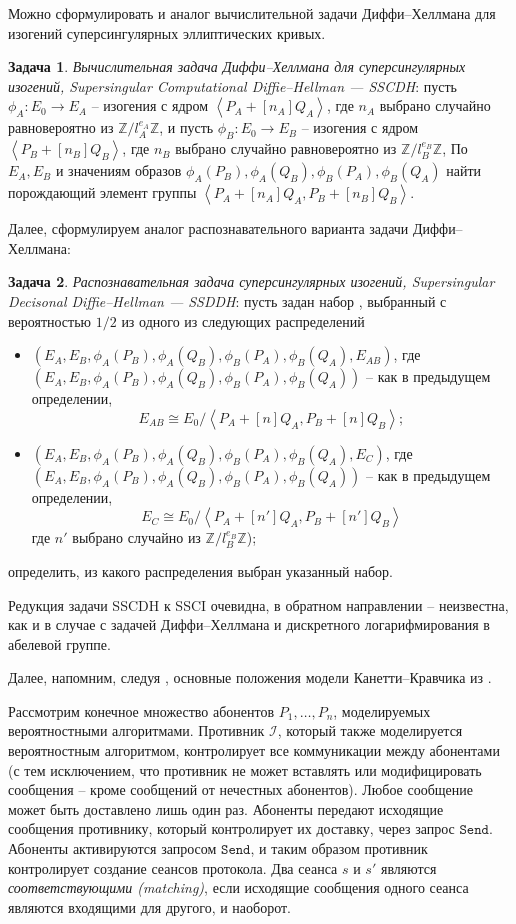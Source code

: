\documentclass[a4paper,12pt]{article}
\newcommand{\ZZ}{\mathbb{Z}}
\newcommand{\tr}[1]{\left\langle #1\right\rangle}
\theoremstyle{definition}
\newtheorem{problem}{Задача}
\begin{document}
Можно сформулировать и аналог вычислительной задачи Диффи--Хеллмана для изогений суперсингулярных эллиптических кривых.

\begin{problem}\label{problem32} \emph{Вычислительная задача Диффи--Хеллмана для суперсингулярных изогений, Supersingular Computational Diffie--Hellman ---  SSCDH}: 
пусть $\phi_A: E_0 \to E_A$ -- изогения с ядром $\tr{P_A+[n_A]Q_A}$, где   $n_A $ выбрано случайно равновероятно из $\ZZ/l_A^{e_A}\ZZ$,
и пусть $\phi_B: E_0 \to E_B$ -- изогения с ядром $\tr{P_B+[n_B]Q_B}$, где   $n_B $ выбрано случайно равновероятно из $\ZZ/l_B^{e_B}\ZZ$,
По $E_A,E_B$ и значениям образов $\phi_A(P_B), \phi_A(Q_B), \phi_B(P_A), \phi_B(Q_A)$ найти порождающий элемент группы $\tr{P_A+[n_A]Q_A, P_B+[n_B]Q_B}$.
\end{problem}

Далее, сформулируем аналог распознавательного варианта задачи Диффи--Хеллмана: 

 \begin{problem}\label{problem8} \emph{Распознавательная задача суперсингулярных изогений, Supersingular Decisonal Diffie--Hellman --- SSDDH}: пусть задан набор , выбранный с вероятностью $1/2$ из одного из следующих распределений
\begin{itemize}
\item $(E_A,E_B,\phi_A(P_B), \phi_A(Q_B), \phi_B(P_A), \phi_B(Q_A),E_{AB})$, где\\ $(E_A,E_B,\phi_A(P_B), \phi_A(Q_B), \phi_B(P_A), \phi_B(Q_A))$ -- как в предыдущем определении,
$$
E_{AB} \cong E_0/\tr{P_A+[n]Q_A, P_B+[n]Q_B};
$$
\item $(E_A,E_B,\phi_A(P_B), \phi_A(Q_B), \phi_B(P_A), \phi_B(Q_A),E_{C})$, где\\  $(E_A,E_B,\phi_A(P_B), \phi_A(Q_B), \phi_B(P_A), \phi_B(Q_A))$ --  как в предыдущем определении,  
$$
E_C \cong E_0/\tr{P_A+[n']Q_A, P_B+[n']Q_B}
$$
где $ n'$ выбрано случайно из $\ZZ/l_B^{e_B}\ZZ$);
\end{itemize}
определить, из какого распределения выбран указанный набор. 
\end{problem}

Редукция задачи SSCDH к SSCI очевидна, в обратном направлении -- неизвестна, как и в случае с задачей Диффи--Хеллмана и дискретного логарифмирования в абелевой группе.

Далее, напомним, следуя \cite{DF}, основные положения модели Канетти--Кравчика из \cite{CK}.

Рассмотрим конечное множество абонентов $P_1,\dots,P_n$, моделируемых вероятностными алгоритмами. Противник $\mathcal{I}$, который также моделируется вероятностным алгоритмом,
контролирует все коммуникации между абонентами (с тем исключением, что противник не может вставлять или модифицировать сообщения -- кроме сообщений от нечестных абонентов).
Любое сообщение может быть доставлено лишь один раз. Абоненты передают исходящие сообщения противнику, который контролирует их доставку, через запрос $\mathtt{Send}$. Абоненты
активируются запросом $\mathtt{Send}$, и таким образом противник контролирует создание сеансов протокола. Два сеанса $s$ и $s'$ являются \emph{соответствующими (matching)}, если
исходящие сообщения одного сеанса являются входящими для другого, и наоборот.
\end{document}
